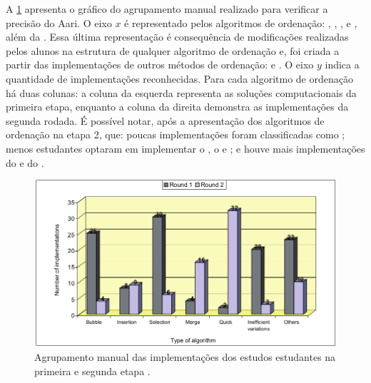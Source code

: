 		A \cref{fig:clusterManual} apresenta o gráfico do agrupamento manual
		realizado para verificar a precisão do Aari. O eixo $x$ é representado pelos
		algoritmos de ordenação: , ,
		,  e , além
		da . Essa última representação é consequência
		de modificações realizadas pelos alunos na estrutura de qualquer algoritmo de
		ordenação e,  foi criada a partir das implementações de outros
		métodos de ordenação:  e . O eixo $y$
		indica a quantidade de implementações reconhecidas. Para cada algoritmo de
		ordenação há duas colunas: a coluna da esquerda representa as soluções
		computacionais da primeira etapa, enquanto a coluna da direita demonstra as
		implementações da segunda rodada. É possível notar, após a apresentação dos
		algoritmos de ordenação na etapa 2, que: poucas implementações foram
		classificadas como ; menos estudantes optaram
		em implementar o , o  e
		; e houve mais implementações do  e do
		.
	    
	    \begin{figure}[h]
	        \centering
	        \includegraphics[scale=0.4]{imagem/clusterManual.png}
	        \captionsetup{justification=centering}
	        \caption[Agrupamento manual das implementações dos estudos estudantes na
	        primeira e segunda etapa]{Agrupamento manual das implementações dos estudos estudantes na
	        primeira e segunda etapa \cite{Taherkhani:2012}.}
	        \label{fig:clusterManual}
	    \end{figure}
	    
